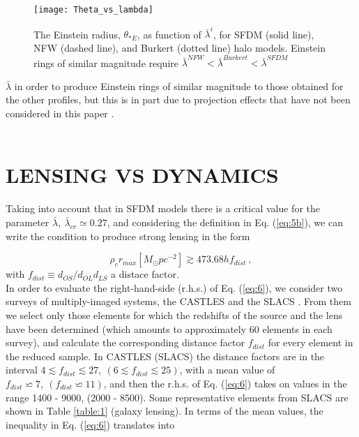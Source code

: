 \documentclass[8pt,letterpaper,twocolumn]{article}
\newcommand{\bl}{\bar{\lambda}}
\newcommand{\msun}{M_{\odot}} %
\begin{document}
\begin{figure}[H] \label{fig:2}
\centering
\texttt{[image: Theta\_vs\_lambda]}
\caption{The Einstein radius, $\theta_{*E}$, as function of $\bar{\lambda}^i$, for SFDM (solid line), NFW (dashed line), and Burkert (dotted
line) halo models. Einstein rings of similar magnitude require $\bar{\lambda}^{NFW} < \bar{\lambda}^{Burkert}<\bar{\lambda}^{SFDM} $
}
\end{figure}

\vspace{2em}

\noindent $\bar{\lambda}$ in order to produce Einstein rings of similar magnitude to those obtained for the other profiles, but this is in part due to projection effects that have not been considered in this paper \cite{Kling_2008, Jarosik_2011, Park_2003, Burkert_1995, Wright_2000, Baltz_2009}.\\
\\


\section{LENSING VS DYNAMICS}
\vspace{3mm}
Taking into account that in SFDM models there is a critical value for the parameter $\bl,\ \bl_{cr} \simeq 0.27$, and considering the definition in Eq. (\ref{eq:5b}), we can write the condition to produce strong lensing in the form

\begin{equation}\tag{6} \label{eq:6}
\rho_c r_{max}[\msun p c^{-2}]\gtrsim 473.68 h f_{dist}\ ,
\end{equation}
\vspace{2mm}
with $f_{dist} \equiv d_{OS}/d_{OL}d_{LS}$ a distace factor.\\

In order to evaluate the right-hand-side (r.h.s.) of Eq. (\ref{eq:6}), we consider two surveys of multiply-imaged systems, the CASTLES \cite{Bolton_2008} and the SLACS \cite{Bolton_2008}. From them we select only those elements for which the redshifts of the source and the lens have been determined (which amounts to approximately 60 elements in each survey), and calculate the corresponding distance factor $f_{dist}$ for every element in the reduced sample. In CASTLES (SLACS) the distance factors are in the interval $4 \lesssim f_{dist}  \lesssim 27,\ (6 \lesssim f_{dist} \lesssim 25)$, with a mean value of $f_{dist} \backsimeq 7,\ (f_{dist} \backsimeq 11)$, and then the r.h.s. of Eq. (\ref{eq:6}) takes on values in the range 1400 - 9000, (2000 - 8500). Some representative elements from SLACS are shown in Table \ref{table:1} (galaxy lensing). In terms of the mean values, \hypertarget{eq:7}{the} inequality in Eq. (\ref{eq:6}) translates into
\end{document}
